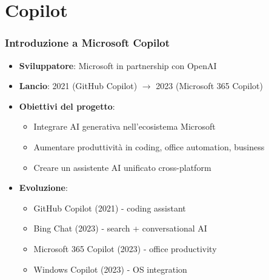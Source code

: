 \documentclass[aspectratio=169]{beamer}
\begin{document}
\section{Copilot}
%
%
\begin{frame}
\frametitle{Introduzione a Microsoft Copilot}
\begin{itemize}
    \item \textbf{Sviluppatore}: Microsoft in partnership con OpenAI
    \item \textbf{Lancio}: 2021 (GitHub Copilot) $\rightarrow$ 2023 (Microsoft 365 Copilot)
    \item \textbf{Obiettivi del progetto}:
    \begin{itemize}
        \item Integrare AI generativa nell'ecosistema Microsoft
        \item Aumentare produttività in coding, office automation, business
        \item Creare un assistente AI unificato cross-platform
    \end{itemize}
    \item \textbf{Evoluzione}:
    \begin{itemize}
        \item GitHub Copilot (2021) - coding assistant
        \item Bing Chat (2023) - search + conversational AI
        \item Microsoft 365 Copilot (2023) - office productivity
        \item Windows Copilot (2023) - OS integration
    \end{itemize}
\end{itemize}
\end{frame}
%
%
\end{document}

